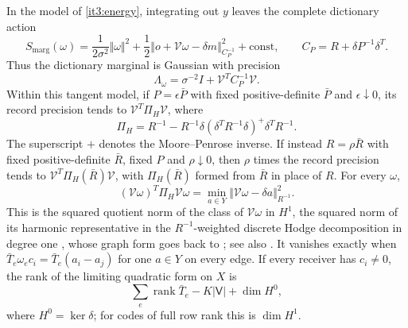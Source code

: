 In the model of \cref{it3:energy}, integrating out $y$ leaves the complete dictionary action
\begin{equation}
S_{\mathrm{marg}}(\omega)
=\frac1{2\sigma^2}\Vert\omega\Vert^2
+\frac12\Vert o+\mathcal V\omega-\delta m\Vert_{C_P^{-1}}^2
+\mathrm{const},\qquad
C_P=R+\delta P^{-1}\delta^T.
\label{it3:affine-action}
\end{equation}
Thus the dictionary marginal is Gaussian with precision
\begin{equation}
\Lambda_\omega=\sigma^{-2}I+\mathcal V^TC_P^{-1}\mathcal V.
\label{it3:marginal}
\end{equation}
Within this tangent model, if $P=\epsilon\bar P$ with fixed positive-definite $\bar P$ and $\epsilon\downarrow0$, its record precision tends to $\mathcal V^T\Pi_H\mathcal V$, where
\begin{equation}
\Pi_H=R^{-1}-R^{-1}\delta(\delta^TR^{-1}\delta)^+\delta^TR^{-1}.
\label{it3:projection}
\end{equation}
The superscript $+$ denotes the Moore--Penrose inverse. If instead $R=\rho\bar R$ with fixed positive-definite $\bar R$, fixed $P$ and $\rho\downarrow0$, then $\rho$ times the record precision tends to $\mathcal V^T\Pi_H(\bar R)\mathcal V$, with $\Pi_H(\bar R)$ formed from $\bar R$ in place of $R$. For every $\omega$,
\begin{equation}
(\mathcal V\omega)^T\Pi_H\mathcal V\omega
=\min_{a\in Y}\Vert\mathcal V\omega-\delta a\Vert_{R^{-1}}^2.
\label{it3:quotient}
\end{equation}
This is the squared quotient norm of the class of $\mathcal V\omega$ in $H^1$, the squared norm of its harmonic representative in the $R^{-1}$-weighted discrete Hodge decomposition in degree one \citep[Theorem~3.1]{HansenGhrist2019}, whose graph form goes back to \citet{Eckmann1944}; see also \citet{Lim2020}. It vanishes exactly when
$\bar T_e\omega_ec_i=\bar T_e(a_i-a_j)$ for one $a\in Y$ on every edge. If every receiver has $c_i\neq0$, the rank of the limiting quadratic form on $X$ is
\begin{equation}
\sum_e\operatorname{rank}\bar T_e-K|\mathsf V|+\dim H^0,
\label{it3:rank-general}
\end{equation}
where $H^0=\ker\delta$; for codes of full row rank this is $\dim H^1$.

